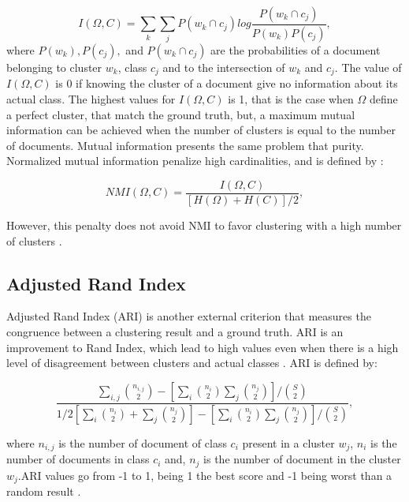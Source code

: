 $$I(\Omega, C) = \sum_k\sum_j P(w_k \cap c_j) log\frac{P(w_k \cap c_j)}{P(w_k) P(c_j)},$$
where $P(w_k), P(c_j),$ and $P(w_k \cap c_j)$ are the probabilities of a document belonging to cluster $w_k$, class $c_j$ and to the intersection of $w_k$ and $c_j$. The value of $I(\Omega, C)$ is 0 if knowing the cluster of a document give no information about its actual class. The highest values for $I(\Omega, C)$ is 1, that is the case when $\Omega$ define a perfect cluster, that match the ground truth, but, a maximum mutual information can be achieved when the number of clusters is equal to the number of documents. Mutual information presents the same problem that purity. Normalized mutual information penalize high cardinalities, and is defined by \cite{manning2008introduction}:

$$NMI(\Omega, C) = \frac{I(\Omega, C)}{[H(\Omega) + H(C)]/2},$$

However, this penalty does not avoid NMI to favor clustering with a high number of clusters \cite{nmi.fair}.

\subsection{Adjusted Rand Index}

Adjusted Rand Index (ARI) is another external criterion that measures the congruence between a clustering result and a ground truth. ARI is an improvement to Rand Index, which lead to high values even when there is a high level of disagreement between clusters and actual classes \cite{comparing.partitions}. ARI is defined by:

$$\frac{\sum_{i,j}{n_{i,j}\choose 2} - \left[ \sum_i {n_{i}\choose 2} \sum_j {n_{j}\choose 2} \right] / {S\choose 2}}{1/2 \left[ \sum_i {n_{i}\choose 2} + \sum_j {n_{j}\choose 2} \right] - \left[ \sum_i {n_{i}\choose 2}\sum_j {n_{j}\choose 2} \right] / {S\choose 2}},$$

where $n_{i,j}$ is the number of document of class $c_i$ present in a cluster $w_j$, $n_i$ is the number of documents in class $c_i$ and, $n_j$ is the number of document in the cluster $w_j$.ARI values go from -1 to 1, being 1 the best score and -1 being worst than a random result \cite{clust.short.text}.

\newpage
